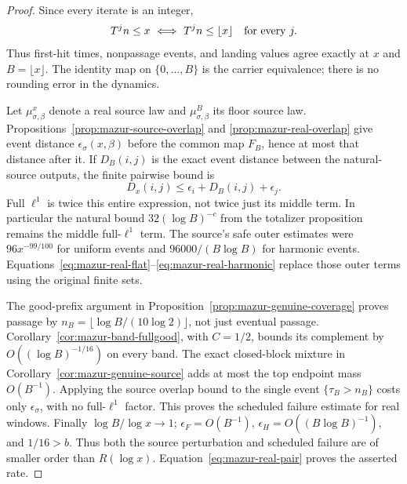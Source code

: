 \documentclass[11pt]{article}
\theoremstyle{remark}\newtheorem{remark}[proposition]{Remark}
\begin{document}
\begin{proof}
Since every iterate is an integer,
\[
 T^j n\le x\ \Longleftrightarrow\ T^j n\le\lfloor x\rfloor
 \quad\hbox{for every }j.
\]
Thus first-hit times, nonpassage events, and landing values agree
exactly at \(x\) and \(B=\lfloor x\rfloor\).
The identity map on \(\{0,\ldots,B\}\) is the carrier equivalence;
there is no rounding error in the dynamics.

Let \(\mu_{\sigma,\beta}^{x}\) denote a real source law and
\(\mu_{\sigma,\beta}^{B}\) its floor source law.
Propositions~\ref{prop:mazur-source-overlap} and
\ref{prop:mazur-real-overlap} give event distance
\(\epsilon_\sigma(x,\beta)\) before the common map \(F_B\), hence
at most that distance after it. If \(D_B(i,j)\) is the exact
event distance between the natural-source outputs, the finite
pairwise bound is
\begin{equation}
 D_x(i,j)\le\epsilon_i+D_B(i,j)+\epsilon_j.
 \label{eq:mazur-real-pair}
\end{equation}
Full \(\ell^1\) is twice this entire expression, not twice just its
middle term. In particular the natural bound \(32(\log B)^{-c}\)
from the totalizer proposition remains the middle full-\(\ell^1\)
term. The source's safe outer estimates were \(96x^{-99/100}\)
for uniform events and \(96000/(B\log B)\) for harmonic events.
Equations~\eqref{eq:mazur-real-flat}--\eqref{eq:mazur-real-harmonic}
replace those outer terms using the original finite sets.

The good-prefix argument in
Proposition~\ref{prop:mazur-genuine-coverage} proves passage by
\(n_B=\lfloor\log B/(10\log2)\rfloor\), not just eventual passage.
Corollary~\ref{cor:mazur-band-fullgood}, with \(C=1/2\), bounds
its complement by \(O((\log B)^{-1/16})\) on every band.
The exact closed-block mixture in
Corollary~\ref{cor:mazur-genuine-source} adds at most the top
endpoint mass \(O(B^{-1})\). Applying the source overlap bound
to the single event \(\{\tau_B>n_B\}\) costs only
\(\epsilon_\sigma\), with no full-\(\ell^1\) factor.
This proves the scheduled failure estimate for real windows.
Finally \(\log B/\log x\to1\);
\(\epsilon_F=O(B^{-1})\), \(\epsilon_H=O((B\log B)^{-1})\),
and \(1/16>b\). Thus both the source perturbation and scheduled
failure are of smaller order than \(R(\log x)\).
Equation~\eqref{eq:mazur-real-pair} proves the asserted rate.
\end{proof}
\end{document}
